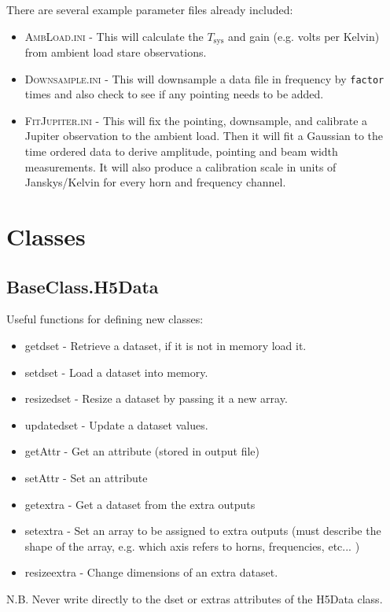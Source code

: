\documentclass[11pt]{article}
\begin{document}
There are several example parameter files already included:
\begin{itemize}
  \item \textsc{AmbLoad.ini}    - This will calculate the $T_\mathrm{sys}$ and gain (e.g. volts per Kelvin) from ambient load stare observations.
  \item \textsc{Downsample.ini} - This will downsample a data file in frequency by \texttt{factor} times and also check to see if any pointing needs to be added.
  \item \textsc{FitJupiter.ini} - This will fix the pointing, downsample, and calibrate a Jupiter observation to the ambient load. Then it will fit a Gaussian to the time ordered data to derive amplitude, pointing and beam width measurements. It will also produce a calibration scale in units of Janskys/Kelvin for every horn and frequency channel.
\end{itemize}


\section{Classes}\label{sec:classes}

\subsection{BaseClass.H5Data}

Useful functions for defining new classes:
\begin{itemize}
  \item getdset - Retrieve a dataset, if it is not in memory load it.
  \item setdset - Load a dataset into memory.
  \item resizedset - Resize a dataset by passing it a new array.
  \item updatedset - Update a dataset values.
  \item getAttr    - Get an attribute (stored in output file)
  \item setAttr    - Set an attribute
  \item getextra - Get a dataset from the extra outputs
  \item setextra - Set an array to be assigned to extra outputs (must describe the shape of the array, e.g. which axis refers to horns, frequencies, etc... )
  \item resizeextra - Change dimensions of an extra dataset.
\end{itemize}
N.B. Never write directly to the dset or extras attributes of the H5Data class.
\end{document}
